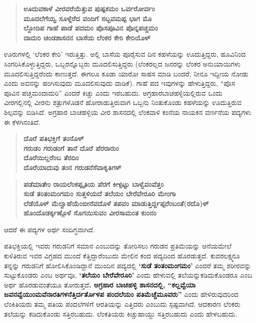 \begin{verse}
\textbf{ಊದುವಕಾಳೆ ವೀರವರೆಯೆತ್ತುವ ಪುಷ್ಪಕಮಂ ಒರ್ವರೋರ್ವಂ } \\\textbf{ಮೂದಲೆಗೆಯ್ವ ಸೂಳ್ನೆರೆದ ವಂದಿಗೆ ಸಬ್ಬವಮಪ್ಪ ಭಾಗ ಮೊ} \\\textbf{ ಲ್ದೋದಿಪ ಗಾಹೆ ಪಾಡೆ ಪದಮಂ ಪೊಸಪೂವಿನ ಪೊನ್ನಪಚ್ಚಮಂ} \\\textbf{ದಾದುರಿ ಚಂಡಶಾಸನನ ಬಾಸೆಯ ಲೆಂಕರ ಕೇರಿ ಕೇರಿಯೊಳ್​ }
\end{verse}

ಊರುಗಳಲ್ಲಿ ‘ಲೆಂಕರ ಕೇರಿ’ ಇರುತ್ತಿತ್ತು. ಅಲ್ಲಿ ಬಾಸೆಯ ಪೂರೈಸುವ ದಿನ ಕಹಳೆಯನ್ನು ಊದುತ್ತಿದ್ದರು, ಹೂವಿನಿಂದ ಸಿಂಗರಿಸಿಕೊಳ್ಳುತ್ತಿದ್ದರು, ಒಬ್ಬರನ್ನೊಬ್ಬರು ಮೂದಲಿಸುತ್ತಿದ್ದರು (ಲೆಂಕರಲ್ಲದ ಜನರನ್ನು ಲೆಂಕರ ಅನುಯಾಯಿಗಳು ಮೂದಲಿಸುತ್ತಿದ್ದ\-ರೆಂದು ಕಾಣುತ್ತದೆ. ಈಗಲೂ ಕೂಡಾ ಯಾರೋ ಸಾಹಸ ಮಾಡಿ ಬಂದರೆ, ನೀನೂ ಇದ್ದೀಯ ನೋಡು ಎಂದು ಅವನನ್ನು ಹಂಗಿಸುವುದು ಮೂದಲಿಸುವುದು ವಾಡಿಕೆ). ಗಾಹೆ ಪದ ಇವುಗಳನ್ನು ಹೇಳುತ್ತಿದ್ದರು, “ಪೊಸ ಪೂವಿನ ಪಚ್ಚಮಂದಾದುರಿ” ಎಂದರೆ ಕಿಚ್ಚು ಎಂದು ಇರಬಹುದು. ಅಗ್ರಹಾರಬಾಚಹಳ್ಳಿಯಲ್ಲಿರುವ ಒಂದು ವೀರಗಲ್ಲಿನಲ್ಲಿ ವೀರನು ಶತ್ರುಗಳೊಡನೆ ಹೋರಾಡುತ್ತಿರುವಾಗ ಒಬ್ಬನು ನಿಂತುಕೊಂಡು ಕಹಳೆಯನ್ನು ಊದುತ್ತಿರುವ ಶಿಲ್ಪವನ್ನು ಬಿಡಿಸಿದೆ. ಅಗ್ರಹಾರ ಬಾಚಹಳ್ಳಿಯ ವೀರ ಶಾಸನದಲ್ಲಿ ಲೆಂಕವಾಳಿ ಕಂನೆಯ ನಾಯಕನ ವರ್ಣನೆಯ ಪದ್ಯಗಳು ಈ ಕೆಳಗಿನಂತಿವೆ.

\begin{verse}
\textbf{ದೊರೆ ಪತಿಭಕ್ತಿಗೆ ತಂನೊಳ್​} \\\textbf{ಗರುಡಂ ಗರುಡಂಗೆ ತಾನೆ ದೊರೆ ಪೆರರಾರುಂ} \\\textbf{ದೊರೆಯಿಲ್ಲರೆಂಬ ತೆರದಿಂ} \\\textbf{ದೊರೆಯಾದುವು ತಂನ ಗರುಡನೆಸೆವಾಕೃತಿಗಳ್​}
\end{verse}

\newpage

\begin{verse}
\textbf{ಪಡೆಮಾತೇಂ ರಾಯಲೆಂಕಪ್ಪೃತಿಯ ಪೆರಗೆ ಕೀಳ್ಪಟ್ಟು ಬಾಳ್ವೆವಂವೆತ್ತಂ} \\\textbf{ಸುಡೆ ತಂತಂಮಂಗಮಂ ಸುತ್ತಳಿಯದೆ ತಲೆಯಂ ಬೇರೆವೇರೂರಿ ಮೇಂಗಾ} \\\textbf{ಲೆಡೆಯೊಳ್​ ಮೆಲ್ವಾಹೆಯೆಂಬೀನೆವದೊಳೆ ತಪವಂ ಮಾಡುತ್ತಿರ್ದ್ದಪ್ಪರೆಂಬಂತೆ(ರದೊ)ಳ್​} \\\textbf{ಹೊಂದೊಡರ್ಕ್ಕಣ್ಗೊಳೆ ಸೊಗಯಿಸುವಂ ವೀರಸಾಮಂತ ಕುಂನಂ}
\end{verse}

ಆದರೆ ಈ ಪದ್ಯಗಳ ಅರ್ಥ ಸಂದಿಗ್ಧವಾಗಿದೆ.

ಪತಿಭಕ್ತಿಯಲ್ಲಿ ಇವರು ಗರುಡನಿಗೆ ಸಮಾನ ಎಂಬುದನ್ನು ತೋರಿಸಲು ಗರುಡನ ಪ್ರತಿಮೆಯನ್ನು ಆನೆಯ\break ಮೇಲೆ ಕುಳಿತಿರುವ ಇವರ ವಿಗ್ರಹದ ಮುಂದೆ ಕೆತ್ತಿದ್ದಾರೆಂಬುದು ಮೇಲಿನ ಕಂದ ಪದ್ಯದಿಂದ ಹೊರಡುತ್ತದೆ. ಕುವರ\break ಲಕ್ಷ್ಮನೂ ತನ್ನನ್ನು ಗರುಡನಿಗೆ ಹೋಲಿಸಿಕೊಂಡಿದ್ದಾನೆ ಮುಂದಿನ ಪದ್ಯದಲ್ಲಿ \textbf{‘ಸುಡೆ ತಂತಂಮಂಗಮಂ’} ಎಂದರೆ ತಮ್ಮ ಶರೀರವನ್ನು ಸುಟ್ಟುಕೊಂಡರು ಎಂಬ ಅರ್ಥವೂ, \textbf{‘ತಲೆಯಂ ಬೇರೆವೇರೂರಿ’} ಎಂದು ಹೇಳುವಲ್ಲಿ ತಲೆಯನ್ನು\break ಕಡಿದುಕೊಂಡರೂ ಎಂಬ ಅರ್ಥ ಹೊರಡುವಂತೆಯೂ ತೋರುತ್ತದೆ\textbf{. ಅಗ್ರಹಾರ ಬಾಚಹಳ್ಳಿ ಶಾಸನದಲ್ಲಿ, “ಕಲ್ಲವ್ವೆಯಾ ಜವನವ್ವೆಯುಂಮವೆನಾರತಿಗಳನೆತ್ತಿರ್ದರ್ತೊಳಪ ಪಂದಲೆಯಂ ಪತಿಮೆಚ್ಚೆಮೂವರು”} ಎಂದು ಹೇಳಿರುವುದರಿಂದ ಲೆಂಕಿತಿಯರು ತಮ್ಮ ಪತಿಯ ಪಂದಲೆಗಳಿಗೆ ಆರತಿಯನ್ನು ಎತ್ತಿದರು ಎಂಬುದು ಸ್ಪಷ್ಟವಾಗಿದೆ. ಆದಕಾರಣ ಲೆಂಕರು ತಲೆಯನ್ನು ಕಡಿದುಕೊಂಡು ಸತ್ತಿರಬಹುದು. ಲೆಂಕತಿಯರು ಕಿಚ್ಚುಹಾಯ್ದು ಸತ್ತಿರಬಹುದು ಎಂದು ಹೇಳಬಹುದು.

